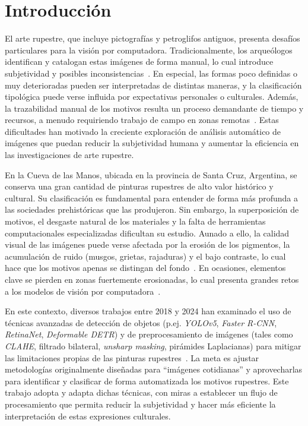 \chapter{Introducción}

El arte rupestre, que incluye pictografías y petroglifos antiguos, presenta desafíos particulares para la visión por computadora. Tradicionalmente, los arqueólogos identifican y catalogan estas imágenes de forma manual, lo cual introduce subjetividad y posibles inconsistencias~\cite{horn2022,suhaimi2023}. En especial, las formas poco definidas o muy deterioradas pueden ser interpretadas de distintas maneras, y la clasificación tipológica puede verse influida por expectativas personales o culturales. Además, la trazabilidad manual de los motivos resulta un proceso demandante de tiempo y recursos, a menudo requiriendo trabajo de campo en zonas remotas~\cite{horn2022,suhaimi2023}. Estas dificultades han motivado la creciente exploración de análisis automático de imágenes que puedan reducir la subjetividad humana y aumentar la eficiencia en las investigaciones de arte rupestre.

En la Cueva de las Manos, ubicada en la provincia de Santa Cruz, Argentina, se conserva una gran cantidad de pinturas rupestres de alto valor histórico y cultural. Su clasificación es fundamental para entender de forma más profunda a las sociedades prehistóricas que las produjeron. Sin embargo, la superposición de motivos, el desgaste natural de los materiales y la falta de herramientas computacionales especializadas dificultan su estudio. Aunado a ello, la calidad visual de las imágenes puede verse afectada por la erosión de los pigmentos, la acumulación de ruido (musgos, grietas, rajaduras) y el bajo contraste, lo cual hace que los motivos apenas se distingan del fondo~\cite{jalandoni2022,suhaimi2023}. En ocasiones, elementos clave se pierden en zonas fuertemente erosionadas, lo cual presenta grandes retos a los modelos de visión por computadora~\cite{horn2022}.

En este contexto, diversos trabajos entre 2018 y 2024 han examinado el uso de técnicas avanzadas de detección de objetos (p.ej. \textit{YOLOv5}, \textit{Faster R-CNN}, \textit{RetinaNet}, \textit{Deformable DETR}) y de preprocesamiento de imágenes (tales como \textit{CLAHE}, filtrado bilateral, \textit{unsharp masking}, pirámides Laplacianas) para mitigar las limitaciones propias de las pinturas rupestres~\cite{horn2022,alvarez2021,suhaimi2023}. La meta es ajustar metodologías originalmente diseñadas para “imágenes cotidianas” y aprovecharlas para identificar y clasificar de forma automatizada los motivos rupestres. Este trabajo adopta y adapta dichas técnicas, con miras a establecer un flujo de procesamiento que permita reducir la subjetividad y hacer más eficiente la interpretación de estas expresiones culturales.

